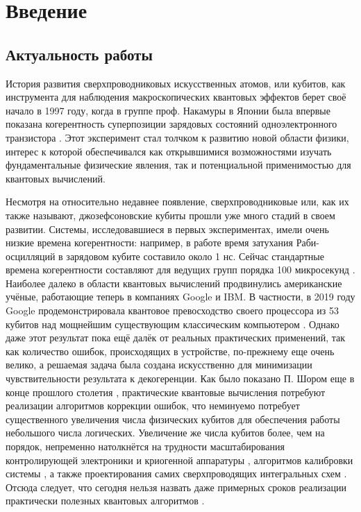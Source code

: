 \documentclass[14pt, a4paper]{extreport}
\numberwithin{equation}{section}
\begin{document}
\tableofcontents

\chapter*{Введение}

\section*{Актуальность работы}

История развития сверхпроводниковых искусственных атомов, или кубитов, как инструмента для наблюдения макроскопических квантовых эффектов берет своё начало в 1997 году, когда в группе проф. Накамуры в Японии была впервые показана когерентность суперпозиции зарядовых состояний одноэлектронного транзистора \cite{nakamura1997spectroscopy}. Этот эксперимент стал толчком к развитию новой области физики, интерес к которой обеспечивался как открывшимися возможностями изучать фундаментальные физические явления, так и потенциальной применимостью для квантовых вычислений.

Несмотря на относительно недавнее появление, сверхпроводниковые или, как их также называют, джозефсоновские кубиты прошли уже много стадий в своем развитии. Системы, исследовавшиеся в первых экспериментах, имели очень низкие времена когерентности: например, в работе \cite{nakamura1999coherent} время затухания Раби-осцилляций в зарядовом кубите составило около 1 нс. Сейчас стандартные времена когерентности составляют для ведущих групп порядка 100 микросекунд \cite{kjaergaard2020superconducting}. Наиболее далеко в области квантовых вычислений продвинулись американские учёные, работающие теперь в компаниях Google и IBM. В частности, в 2019 году Google продемонстрировала квантовое превосходство своего процессора из 53 кубитов над мощнейшим существующим классическим компьютером \cite{arute2019quantum}. Однако даже этот результат пока ещё далёк от реальных практических применений, так как количество ошибок, происходящих в устройстве, по-прежнему еще очень велико, а решаемая задача была создана искусственно для минимизации чувствительности результата к декогеренции. Как было показано П. Шором еще в конце прошлого столетия \cite{shor1995scheme}, практические квантовые вычисления потребуют реализации алгоритмов коррекции ошибок, что неминуемо потребует существенного увеличения числа физических кубитов для обеспечения работы небольшого числа логических. Увеличение же числа кубитов более, чем на порядок, непременно натолкнётся на трудности масштабирования контролирующей электроники и криогенной аппаратуры \cite{krinner2019engineering}, алгоритмов калибровки системы \cite{arute2019quantum, kelly2018physical}, а также проектирования самих сверхпроводящих интегральных схем \cite{hutchings2017tunable}. Отсюда следует, что сегодня нельзя назвать даже примерных сроков реализации практически полезных квантовых алгоритмов \cite{arute2019quantum}.
\end{document}
